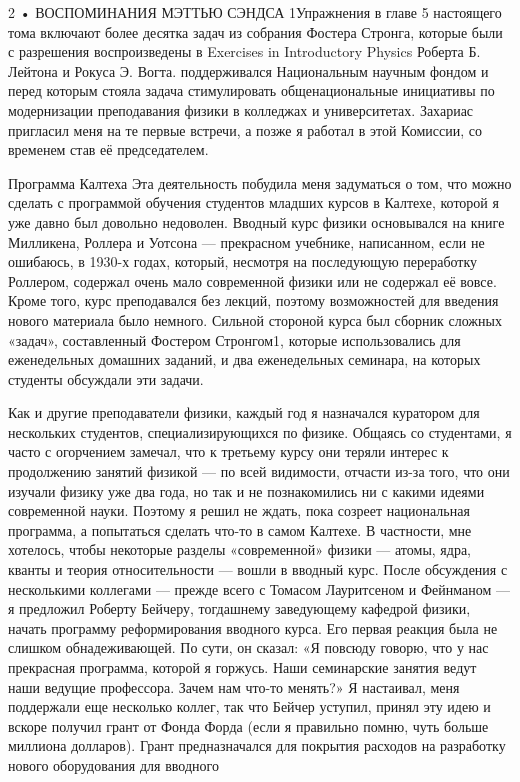 \documentclass[11pt,oneside]{article}
\begin{document}
2 • ВОСПОМИНАНИЯ МЭТТЬЮ СЭНДСА 1Упражнения в главе 5 настоящего тома включают более десятка задач из собрания Фостера Стронга, которые были с разрешения воспроизведены в Exercises in Introductory Physics Роберта Б. Лейтона и Рокуса Э. Вогта. поддерживался Национальным научным фондом и перед которым стояла задача стимулировать общенациональные инициативы по модернизации преподавания физики в колледжах и университетах. Захариас пригласил меня на те первые встречи, а позже я работал в этой Комиссии, со временем став её председателем.\par



Программа Калтеха Эта деятельность побудила меня задуматься о том, что можно сделать с программой обучения студентов младших курсов в Калтехе, которой я уже давно был довольно недоволен. Вводный курс физики основывался на книге Милликена, Роллера и Уотсона --- прекрасном учебнике, написанном, если не ошибаюсь, в 1930-х годах, который, несмотря на последующую переработку Роллером, содержал очень мало современной физики или не содержал её вовсе. Кроме того, курс преподавался без лекций, поэтому возможностей для введения нового материала было немного. Сильной стороной курса был сборник сложных «задач», составленный Фостером Стронгом1, которые использовались для еженедельных домашних заданий, и два еженедельных семинара, на которых студенты обсуждали эти задачи.\par



Как и другие преподаватели физики, каждый год я назначался куратором для нескольких студентов, специализирующихся по физике. Общаясь со студентами, я часто с огорчением замечал, что к третьему курсу они теряли интерес к продолжению занятий физикой --- по всей видимости, отчасти из-за того, что они изучали физику уже два года, но так и не познакомились ни с какими идеями современной науки. Поэтому я решил не ждать, пока созреет национальная программа, а попытаться сделать что-то в самом Калтехе. В частности, мне хотелось, чтобы некоторые разделы «современной» физики --- атомы, ядра, кванты и теория относительности --- вошли в вводный курс. После обсуждения с несколькими коллегами --- прежде всего с Томасом Лауритсеном и Фейнманом --- я предложил Роберту Бейчеру, тогдашнему заведующему кафедрой физики, начать программу реформирования вводного курса. Его первая реакция была не слишком обнадеживающей. По сути, он сказал: «Я повсюду говорю, что у нас прекрасная программа, которой я горжусь. Наши семинарские занятия ведут наши ведущие профессора. Зачем нам что-то менять?» Я настаивал, меня поддержали еще несколько коллег, так что Бейчер уступил, принял эту идею и вскоре получил грант от Фонда Форда (если я правильно помню, чуть больше миллиона долларов). Грант предназначался для покрытия расходов на разработку нового оборудования для вводного\par
\end{document}
